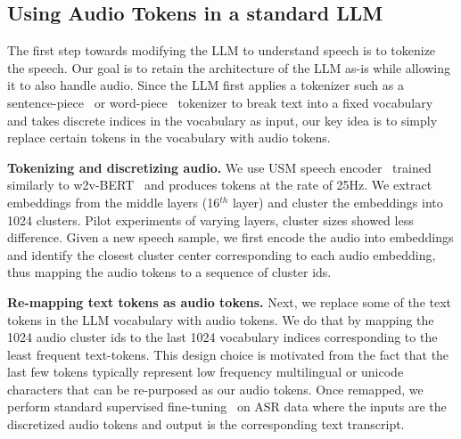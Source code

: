 \documentclass[conference]{IEEEtran}
\begin{document}
%



%

%

%
%
%
%

%
%
%

%
\subsection{Using Audio Tokens in a standard LLM}
The first step towards modifying the LLM to understand speech is to tokenize the speech. Our goal is to retain the architecture of the LLM as-is while allowing it to also handle audio. Since the LLM first applies a tokenizer such as a sentence-piece~\cite{kudo2018sentencepiece} or word-piece~\cite{devlin2018bert} tokenizer to break text into a fixed vocabulary and takes discrete indices in the vocabulary as input, our key idea is to simply replace certain tokens in the vocabulary with audio tokens.

\textbf{Tokenizing and discretizing audio.} 
We use USM speech encoder~\cite{zhang2023google} trained similarly to w2v-BERT~\cite{zhang2023google} and produces tokens at the rate of 25Hz. We extract embeddings from the middle layers (16$^{th}$ layer) and cluster the embeddings into 1024 clusters.
%
Pilot experiments of varying layers, cluster sizes showed less difference.
%
Given a new speech sample, we first encode the audio into embeddings and identify the closest cluster center corresponding to each audio embedding, thus mapping the audio tokens to a sequence of cluster ids.  %

%
%
%
%
%

\textbf{Re-mapping text tokens as audio tokens.} %
Next, we replace some of the text tokens in the LLM vocabulary with audio tokens. We do that by mapping the 1024 audio cluster ids to the last 1024 vocabulary indices corresponding to the least frequent text-tokens.  This design choice is motivated from the fact that the last few tokens typically represent low frequency multilingual or unicode characters that can be re-purposed as our audio tokens. Once remapped, we perform standard supervised fine-tuning~\cite{team2024gemma} on ASR data where the inputs are the discretized audio tokens and output is the corresponding text transcript. %

%
%
%
%
%




%

%
%
%
%
%
\end{document}
